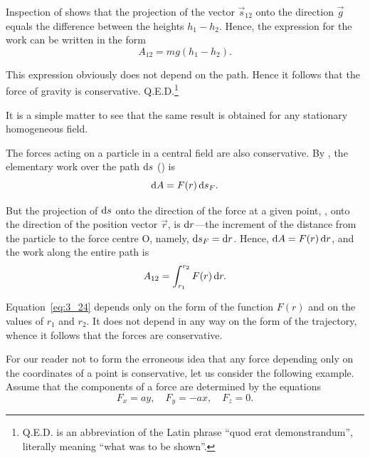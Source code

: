\noindent
Inspection of  shows that the projection of the vector $\vec{s}_{12}$ onto the direction $\vec{g}$ equals the difference between the heights $h_1-h_2$. Hence, the expression for the work can be written in the form
\begin{equation}\label{eq:3_23}
A_{12} = mg(h_1-h_2).
\end{equation}

\noindent
This expression obviously does not depend on the path. Hence it follows that the force of gravity is conservative. Q.E.D.\footnote{Q.E.D. is an abbreviation of the Latin phrase ``quod erat demonstrandum'', literally meaning ``what was to be shown''.}

It is a simple matter to see that the same result is obtained for any stationary homogeneous field.

The forces acting on a particle in a central field are also conservative. By , the elementary work over the path $\mathrm{d} s$ () is
\begin{equation*}
\mathrm{d} A = F(r)\,\mathrm{d} s_F.
\end{equation*}

\noindent
But the projection of $\mathrm{d} s$ onto the direction of the force at a given point, \ie, onto the direction of the position vector $\vec{r}$, is $\mathrm{d} r$---the increment of the distance from the particle to the force centre O, namely, $\mathrm{d} s_F=\mathrm{d} r$. Hence, $\mathrm{d} A=F(r)\,\mathrm{d} r$, and the work along the entire path is
\begin{equation}\label{eq:3_24}
A_{12} = \int_{r_1}^{r_2} F(r)\,\mathrm{d} r.
\end{equation}

\noindent
Equation~\eqref{eq:3_24} depends only on the form of the function $F(r)$ and on the values of $r_1$ and $r_2$. It does not depend in any way on the form of the trajectory, whence it follows that the forces are conservative.

For our reader not to form the erroneous idea that any force depending only on the coordinates of a point is conservative, let us consider the following example. Assume that the components of a force are determined by the equations
\begin{equation}\label{eq:3_25}
F_x = ay,\quad F_y = -ax,\quad F_z=0.
\end{equation}


